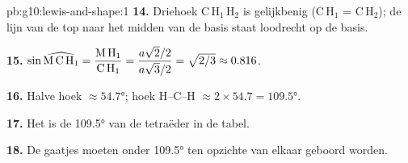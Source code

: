 \begin{solution}{pb:g10:lewis-and-shape:1}
\textbf{14.} Driehoek C\,H$_1$\,H$_2$ is gelijkbenig (C\,H$_1$ =
C\,H$_2$); de lijn van de top naar het midden van de basis staat
loodrecht op de basis.

\textbf{15.} $\sin \widehat{\text{M\,C\,H}_1} = \dfrac{\text{M\,H}_1}{\text{C\,H}_1}
= \dfrac{a\sqrt{2}/2}{a\sqrt{3}/2} = \sqrt{2/3} \approx 0.816$.

\textbf{16.} Halve hoek $\approx \ang{54.7}$; hoek H--C--H $\approx
2 \times 54.7 = \ang{109.5}$.

\textbf{17.} Het is de \ang{109.5} van de tetraëder in de tabel.

\textbf{18.} De gaatjes moeten onder \ang{109.5} ten opzichte van elkaar
geboord worden.
\end{solution}
